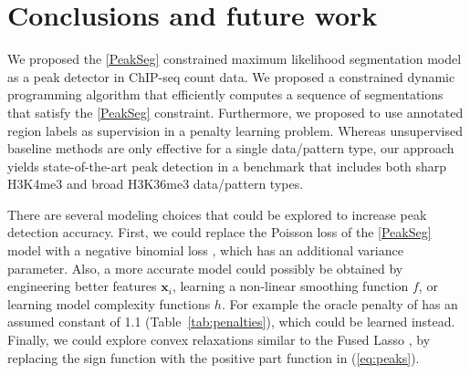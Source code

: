 \documentclass{article}
\begin{document}


\section{Conclusions and future work}
\label{sec:conclusions}

We proposed the \ref{PeakSeg} constrained maximum likelihood
segmentation model as a peak detector in ChIP-seq count data. We
proposed a constrained dynamic programming algorithm that efficiently
computes a sequence of segmentations that satisfy the \ref{PeakSeg}
constraint. Furthermore, we proposed to use annotated region labels as
supervision in a penalty learning problem. Whereas unsupervised
baseline methods are only effective for a single data/pattern type, our
approach yields state-of-the-art peak detection in a benchmark that
includes both sharp H3K4me3 and broad H3K36me3 data/pattern types.

There are several modeling choices that could be explored to increase
peak detection accuracy. First, we could replace the Poisson loss of
the \ref{PeakSeg} model with a negative binomial loss
\citep{cleynen2013segmentation}, which has an additional variance
parameter. Also, a more accurate model could possibly be obtained by
engineering better features $\mathbf x_i$, learning a non-linear
smoothing function $f$, or learning model complexity functions
$h$. For example the oracle penalty of \citet{cleynen2013segmentation}
has an assumed constant of 1.1 (Table~\ref{tab:penalties}), which
could be learned instead. Finally, we could explore convex relaxations
similar to the Fused Lasso \citep{fused-lasso-path}, by replacing the
sign function with the positive part function in 
 (\ref{eq:peaks}).
\end{document}
